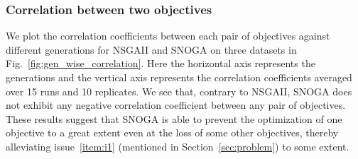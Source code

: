 \subsubsection{Correlation between two objectives} We plot the correlation coefficients between each pair of objectives against different generations for NSGAII and SNOGA on three datasets in Fig.~\ref{fig:gen_wise_correlation}. Here the horizontal axis represents the generations and the vertical axis represents the correlation coefficients averaged over 15 runs and 10 replicates. We see that, contrary to NSGAII, SNOGA does not exhibit any negative correlation coefficient between any pair of objectives. These results suggest that SNOGA is able to prevent the optimization of one objective to a great extent even at the loss of some other objectives, thereby alleviating issue~\ref{item:i1} (mentioned in Section~\ref{sec:problem}) to some extent.%

